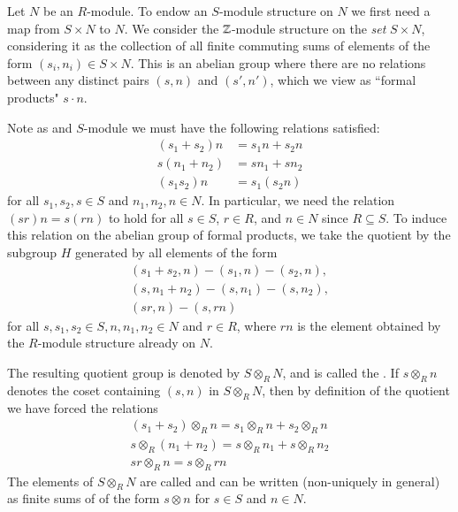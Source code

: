 \begin{cons}
    Let $N$ be an $R$-module. To endow an $S$-module structure on $N$ we first need a map from $S\times N$ to $N$. We consider the $\mathbb Z$-module structure on the \emph{set} $S\times N$, considering it as the collection of all finite commuting sums of elements of the form $(s_i,n_i) \in S\times N$. This is an abelian group where there are no relations between any distinct pairs $(s,n)$ and $(s',n')$, which we view as ``formal products" $s\cdot n$. 

    Note as and $S$-module we must have the following relations satisfied: \begin{align*}
        (s_1+s_2)n &= s_1n+s_2n \\
        s(n_1+n_2) &= sn_1+sn_2 \\
        (s_1s_2)n &= s_1(s_2n)
    \end{align*}
    for all $s_1,s_2,s \in S$ and $n_1,n_2,n \in N$. In particular, we need the relation $(sr)n = s(rn)$ to hold for all $s \in S$, $r \in R$, and $n \in N$ since $R \subseteq S$. To induce this relation on the abelian group of formal products, we take the quotient by the subgroup $H$ generated by all elements of the form \begin{equation*}
        \begin{array}{c}
            (s_1+s_2,n) - (s_1,n) - (s_2,n), \\
            (s,n_1+n_2) - (s,n_1) - (s,n_2), \\
            (sr,n) - (s,rn) 
        \end{array}
    \end{equation*}
    for all $s,s_1,s_2 \in S, n, n_1,n_2 \in N$ and $r \in R$, where $rn$ is the element obtained by the $R$-module structure already on $N$.


    The resulting quotient group is denoted by $S\otimes_R N$, and is called the . If $s\otimes_R n$ denotes the coset containing $(s,n)$ in $S\otimes_R N$, then by definition of the quotient we have forced the relations \begin{equation*}
        \begin{array}{c}
            (s_1+s_2)\otimes_Rn = s_1\otimes_R n + s_2\otimes_R n \\
            s\otimes_R(n_1+n_2) = s\otimes_R n_1+s\otimes_Rn_2 \\
            sr\otimes_R n = s\otimes_Rrn
        \end{array}
    \end{equation*}
    The elements of $S\otimes_RN$ are called  and can be written (non-uniquely in general) as finite sums of  of the form $s\otimes n$ for $s \in S$ and $n \in N$.


\end{cons}

